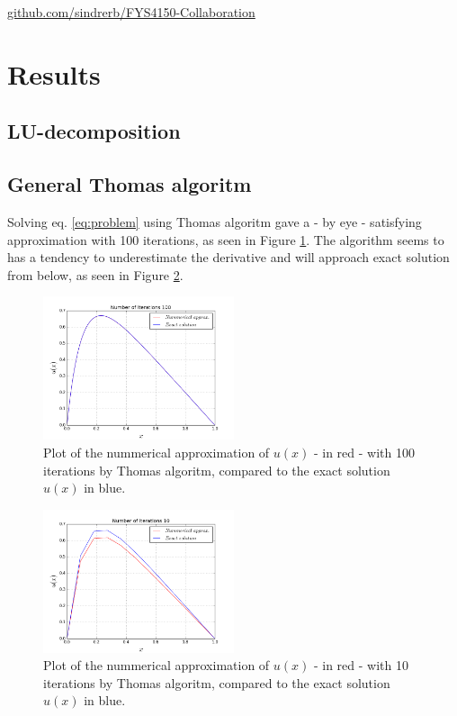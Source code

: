 \documentclass[twoside,twocolumn]{article}
\begin{document}
\begin{center}
 \href{https://github.com/sindrerb/FYS4150-Collaboration}{github.com/sindrerb/FYS4150-Collaboration}
\end{center}

\section{Results}
\subsection{LU-decomposition}

\subsection{General Thomas algoritm}
Solving eq. \ref{eq:problem} using Thomas algoritm gave a - by eye - satisfying approximation with 100 iterations, as seen in Figure \ref{fig:Thomas1E2}. The algorithm seems to has a tendency to underestimate the derivative and will approach exact solution from below, as seen in Figure \ref{fig:Thomas10}.

\begin{figure}[htp]
\includegraphics[width=0.5\textwidth]{figures/b-run1e2.png} 
\caption{Plot of the nummerical approximation of $u(x)$ - in red - with 100 iterations by Thomas algoritm, compared to the exact solution $u(x)$ in blue.} \label{fig:Thomas1E2}
\end{figure}

\begin{figure}[htp]
\includegraphics[width=0.5\textwidth]{figures/b-run10.png} 
\caption{Plot of the nummerical approximation of $u(x)$ - in red - with 10 iterations by Thomas algoritm, compared to the exact solution $u(x)$ in blue.} \label{fig:Thomas10}
\end{figure}
\end{document}

